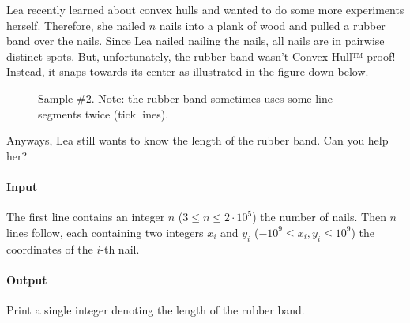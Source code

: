 
\usepackage{tkz-euclide}



\makeheader

Lea recently learned about convex hulls and wanted to
do some more experiments herself.
Therefore, she nailed $n$ nails into a plank of wood and
pulled a rubber band over the nails.
Since Lea nailed nailing the nails, all nails are in
pairwise distinct spots.
But, unfortunately, the rubber band wasn't Convex Hull™ proof!
Instead, it snaps towards its center as illustrated in the figure down below.
\begin{figure}[ht]
  \centering
  \caption{Sample \#2. Note: the rubber band sometimes uses some line segments twice (tick lines).}
  \label{fig:convexhull}
\end{figure}
Anyways, Lea still wants to know the length of the rubber band.
Can you help her?

\paragraph*{Input}

The first line contains an integer $n$ ($3 \leq n \leq 2\cdot10^5$) the number of nails.
Then $n$ lines follow, each containing two integers $x_i$ and $y_i$ ($-10^9 \leq x_i, y_i \leq 10^9$)
the coordinates of the $i$-th nail.

\paragraph*{Output}

Print a single integer denoting the length of the rubber band.

\begin{samples}
\end{samples}

